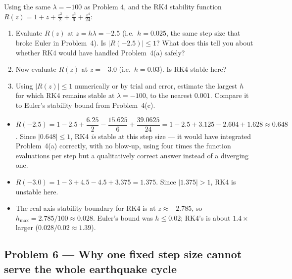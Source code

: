 Using the same $\lambda=-100$ as Problem 4, and the RK4 stability function $R(z) = 1+z+\tfrac{z^2}{2}+\tfrac{z^3}{6}+\tfrac{z^4}{24}$:

\begin{enumerate}[label=(\alph*)]
\item Evaluate $R(z)$ at $z=h\lambda=-2.5$ (i.e.\ $h=0.025$, the same step size that broke Euler in Problem~4). Is $|R(-2.5)|\le1$? What does this tell you about whether RK4 would have handled Problem~4(a) safely?
\item Now evaluate $R(z)$ at $z=-3.0$ (i.e.\ $h=0.03$). Is RK4 stable here?
\item Using $|R(z)|\le1$ numerically or by trial and error, estimate the largest $h$ for which RK4 remains stable at $\lambda=-100$, to the nearest $0.001$. Compare it to Euler's stability bound from Problem~4(c).
\end{enumerate}

\solution
\begin{itemize}
\item[(a)] $R(-2.5) = 1-2.5+\dfrac{6.25}{2}-\dfrac{15.625}{6}+\dfrac{39.0625}{24} = 1-2.5+3.125-2.604+1.628 \approx 0.648$. Since $|0.648|\le1$, RK4 \emph{is} stable at this step size --- it would have integrated Problem~4(a) correctly, with no blow-up, using four times the function evaluations per step but a qualitatively correct answer instead of a diverging one.
\item[(b)] $R(-3.0) = 1-3+4.5-4.5+3.375 = 1.375$. Since $|1.375|>1$, RK4 is unstable here.
\item[(c)] The real-axis stability boundary for RK4 is at $z\approx-2.785$, so $h_{\max} = 2.785/100 \approx 0.028$. Euler's bound was $h\le0.02$; RK4's is about $1.4\times$ larger ($0.028/0.02\approx1.39$).
\end{itemize}


\subsection*{Problem 6 --- Why one fixed step size cannot serve the whole earthquake cycle}

